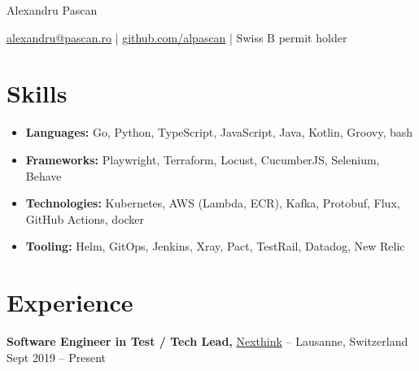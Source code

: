 \documentclass[11pt]{article}       %
\begin{document}
\centerline{\Huge Alexandru Pascan} 

\vspace{5pt}

\centerline{\href{mailto:alexandru@pascan.ro}{alexandru@pascan.ro} | \href{https://github.com/alpascan}{github.com/alpascan} | Swiss B permit holder}

\vspace{-10pt}

\section*{Skills}
\begin{itemize}[leftmargin=*]
    \item \textbf{Languages:} Go, Python, TypeScript, JavaScript, Java, Kotlin, Groovy, bash
    \item \textbf{Frameworks:} Playwright, Terraform, Locust, CucumberJS, Selenium, Behave
    \item \textbf{Technologies:} Kubernetes, AWS (Lambda, ECR), Kafka, Protobuf, Flux, GitHub Actions, docker
    \item \textbf{Tooling:} Helm, GitOps, Jenkins, Xray, Pact, TestRail, Datadog, New Relic
\end{itemize}

\vspace{-18.5pt}

\section*{Experience}

\textbf{Software Engineer in Test / Tech Lead,} \href{https://nexthink.com/}{Nexthink} -- Lausanne, Switzerland \hfill Sept 2019 – Present
\vspace{-9pt}
\end{document}
